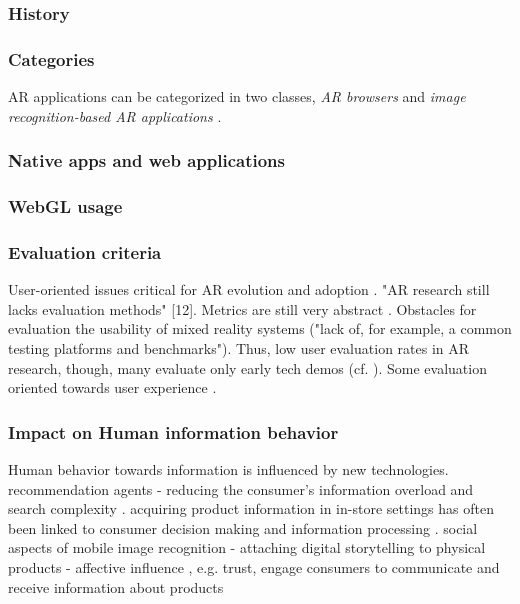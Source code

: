 \documentclass[12pt,journal,compsoc]{IEEEtran}
\begin{document}

\subsubsection{History}

\subsubsection{Categories}
AR applications can be categorized in two classes, \textit{AR browsers} and \textit{image recognition-based AR applications} \cite{Olsson2011a}.

\subsubsection{Native apps and web applications}

\subsubsection{WebGL usage}

\subsubsection{Evaluation criteria}
User-oriented issues critical for AR evolution and adoption \cite{Olsson2011b}. "AR research still lacks evaluation methods" \cite{Gandy2010} [12]. Metrics are still very abstract \cite{Olsson2011a}. Obstacles for evaluation the usability of mixed reality systems ("lack of, for example, a common testing platforms and benchmarks")\cite{Bach2004}.
Thus, low user evaluation rates in AR research, though, many evaluate only early tech demos (cf. \cite{Duenster2008}). Some evaluation oriented towards user experience \cite{Bach2004}.

\subsubsection{Impact on Human information behavior }
Human behavior towards information is influenced by new technologies. recommendation agents - reducing the consumer’s information overload and search complexity \cite{Kowatch2010}. acquiring product information in in-store settings has often been linked to consumer decision making and information processing \cite{Karpischek2010,Kowatch2010,Xiao2007}. social aspects of mobile image recognition - attaching digital storytelling to physical products - affective influence \cite{Barthel2010}, e.g. trust, engage consumers to communicate and receive information about products \cite{Karpischek2010}
\end{document}
